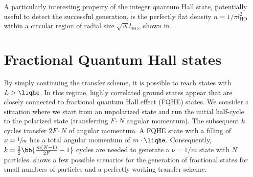 
A particularly interesting property of the integer quantum Hall state, potentially useful to detect the successful generation, is the perfectly flat density $n=1/\pi l_\text{HO}^2$ within a circular region of radial size $\sqrt{N}l_\text{HO}$, shown in~.


\section{Fractional Quantum Hall states}
By simply continuing the transfer scheme, it is possible to reach states with $L>\liqhe$.
In this regime, highly correlated ground states appear that are closely connected to fractional quantum Hall effect (FQHE) states.
We consider a situation where we start from an unpolarized state and run the initial half-cycle to the polarized state (transferring $F\cdot N$ angular momentum).
The subsequent $k$ cycles transfer $2F \cdot N$ of angular momentum. A FQHE state with a filling of $\nu=\sfrac{1}{m}$ has a total angular momentum of $m\cdot \liqhe$.
Consequently, $k = \frac{1}{2} \bb{\frac{m(N-1)}{2F}-1}$ cycles are needed to generate a $\nu=1/m$ state with $N$ particles.
 shows a few possible scenarios for the generation of fractional states for small numbers of particles and a perfectly working transfer scheme.

